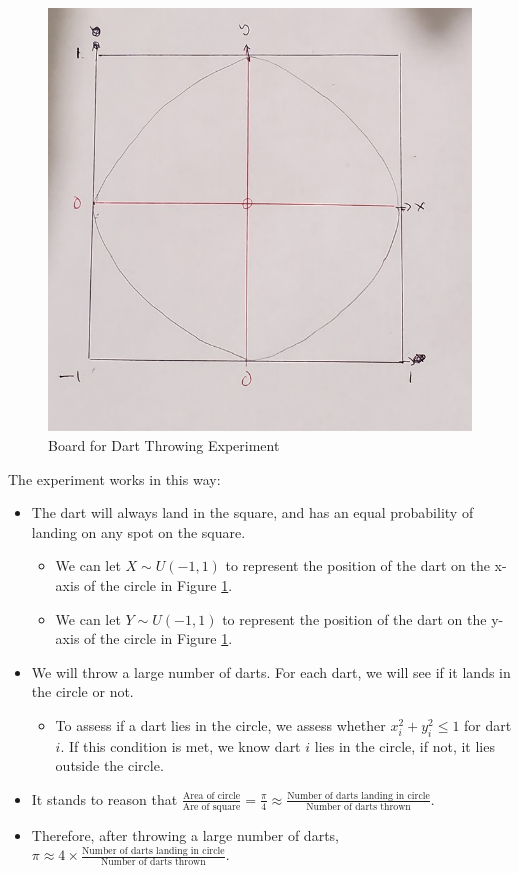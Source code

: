 \documentclass[
]{book}
\providecommand{\tightlist}{%
  \setlength{\itemsep}{0pt}\setlength{\parskip}{0pt}}
\begin{document}
\begin{figure}
\centering
\includegraphics{images/06-circle.jpg}
\caption{\label{fig:circle}Board for Dart Throwing Experiment}
\end{figure}

The experiment works in this way:

\begin{itemize}
\tightlist
\item
  The dart will always land in the square, and has an equal probability of landing on any spot on the square.

  \begin{itemize}
  \tightlist
  \item
    We can let \(X \sim U(-1,1)\) to represent the position of the dart on the x-axis of the circle in Figure \ref{fig:circle}.
  \item
    We can let \(Y \sim U(-1,1)\) to represent the position of the dart on the y-axis of the circle in Figure \ref{fig:circle}.
  \end{itemize}
\item
  We will throw a large number of darts. For each dart, we will see if it lands in the circle or not.

  \begin{itemize}
  \tightlist
  \item
    To assess if a dart lies in the circle, we assess whether \(x_i^2 + y_i^2 \leq 1\) for dart \(i\). If this condition is met, we know dart \(i\) lies in the circle, if not, it lies outside the circle.
  \end{itemize}
\item
  It stands to reason that \(\frac{\text{Area of circle}}{\text{Are of square}} = \frac{\pi}{4} \approx \frac{\text{Number of darts landing in circle}}{\text{Number of darts thrown}}\).
\item
  Therefore, after throwing a large number of darts, \(\pi \approx 4 \times \frac{\text{Number of darts landing in circle}}{\text{Number of darts thrown}}.\)
\end{itemize}
\end{document}
